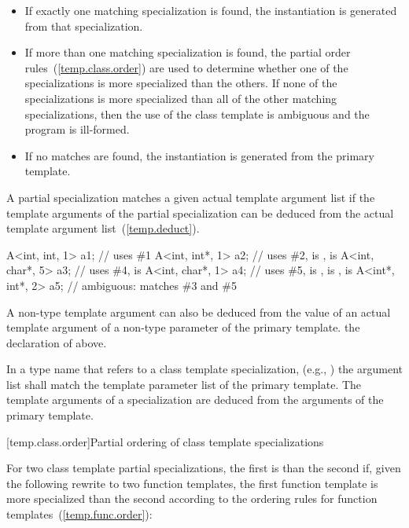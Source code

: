 \begin{itemize}
\item
If exactly one matching specialization is found, the instantiation is
generated from that specialization.
\item
If more than one matching specialization is found,
the partial order rules~(\ref{temp.class.order}) are used to determine
whether one of the specializations is more specialized than the
others.
If none of the specializations is more specialized than all of the
other matching specializations, then the use of the class template
is ambiguous and the program is ill-formed.
\item
If no matches are found, the instantiation is generated from the
primary template.
\end{itemize}

\pnum
A partial specialization matches a given actual template argument
list if the template arguments of the partial specialization can be
deduced from the actual template argument list~(\ref{temp.deduct}).
\enterexample

\begin{codeblock}
A<int, int, 1>   a1;            // uses \#1
A<int, int*, 1>  a2;            // uses \#2,  is ,  is 
A<int, char*, 5> a3;            // uses \#4,  is 
A<int, char*, 1> a4;            // uses \#5,  is ,  is ,  is 
A<int*, int*, 2> a5;            // ambiguous: matches \#3 and \#5
\end{codeblock}
\exitexample

\pnum
A non-type template argument can also be deduced from the value of an actual
template argument of a non-type parameter of the primary template.
\enterexample
the declaration of
above.
\exitexample

\pnum
In a type name that refers to a class template specialization, (e.g.,
)
the argument list shall match the template parameter list of the primary
template.
The template arguments of a specialization are deduced from the arguments
of the primary template.

[temp.class.order]{Partial ordering of class template specializations}

\pnum
For two class template partial specializations,
the first is  than the second if, given the following
rewrite to two function templates, the first function template is more
specialized than the second according to the ordering rules for function
templates~(\ref{temp.func.order}):

